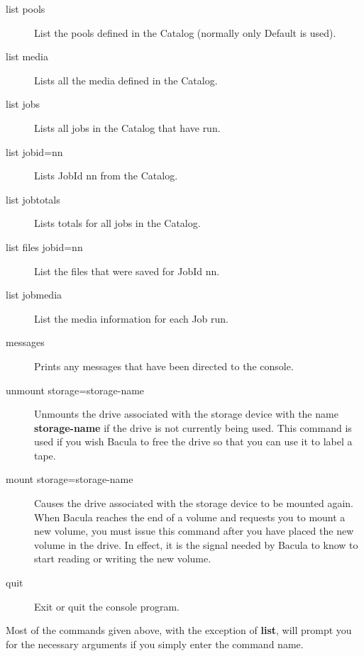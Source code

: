 {{\begin{description}
\item [list pools]
   List the pools defined in the Catalog (normally  only Default is used).  

\item [list media]
   Lists all the media defined in the Catalog.  

\item [list jobs]
   Lists all jobs in the Catalog that have run.  

\item [list jobid=nn]
   Lists JobId nn from the Catalog.  

\item [list jobtotals]
   Lists totals for all jobs in the Catalog.  

\item [list files jobid=nn]
   List the files that were saved for JobId nn.  

\item [list jobmedia]
   List the media information for each Job run.  

\item [messages]
   Prints any messages that have been directed to the console.  

\item [unmount storage=storage-name]
   Unmounts the drive associated with the storage  device with the name {\bf
storage-name} if the drive is not currently being  used. This command is used
if you wish Bacula to free the drive so  that you can use it to label a tape. 


\item [mount storage=storage-name]
   Causes the drive associated with the  storage device to be mounted again. When
Bacula reaches the end of a volume and requests you to mount a  new volume,
you must issue this command after you have placed the  new volume in the
drive. In effect, it is the signal needed by  Bacula to know to start reading
or writing the new volume.  

\item [quit]
   Exit or quit the console program. 
\end{description}

Most of the commands given above, with the exception of {\bf list}, will
prompt you for the necessary arguments if you simply enter the command name. 

}}
